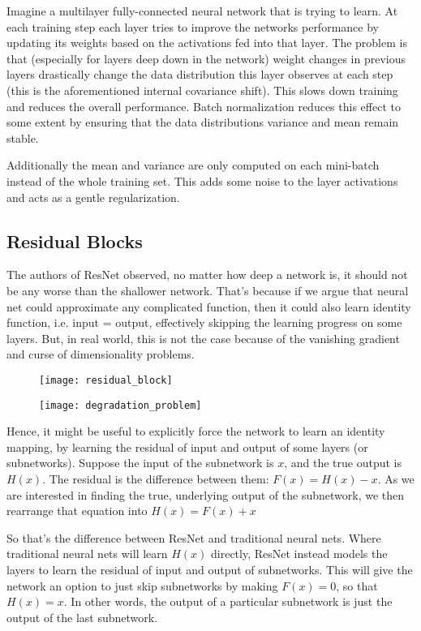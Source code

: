 Imagine a multilayer fully-connected neural network that is trying to learn. At each training step each layer tries to improve the networks performance by updating its weights based on the activations fed into that layer. The problem is that (especially for layers deep down in the network) weight changes in previous layers drastically change the data distribution this layer observes at each step (this is the aforementioned internal covariance shift). This slows down training and reduces the overall performance. Batch normalization reduces this effect to some extent by ensuring that the data distributions variance and mean remain stable.

Additionally the mean and variance are only computed on each mini-batch instead of the whole training set. This adds some noise to the layer activations and acts as a gentle regularization.

\subsection{Residual Blocks \cite{residual-net}}
The authors of ResNet observed, no matter how deep a network is, it should not be any worse than the shallower network. That’s because if we argue that neural net could approximate any complicated function, then it could also learn identity function, i.e. input = output, effectively skipping the learning progress on some layers. But, in real world, this is not the case because of the vanishing gradient and curse of dimensionality problems.

\begin{figure}
	\centering
		\texttt{[image: residual\_block]}
	\label{fig:degradation_problem}
\end{figure}

\begin{figure}
	\centering
		\texttt{[image: degradation\_problem]}
	\label{fig:degradation_problem}
\end{figure}

Hence, it might be useful to explicitly force the network to learn an identity mapping, by learning the residual of input and output of some layers (or subnetworks). Suppose the input of the subnetwork is 
$x$, and the true output is $H(x)$. The residual is the difference between them: $F(x) = H(x) - x$. As we are interested in finding the true, underlying output of the subnetwork, we then rearrange that equation into $H(x) = F(x) + x$

So that’s the difference between ResNet and traditional neural nets. Where traditional neural nets will learn $H(x)$ directly, ResNet instead models the layers to learn the residual of input and output of subnetworks. This will give the network an option to just skip subnetworks by making $F(x) = 0$, so that $H(x) = x$. In other words, the output of a particular subnetwork is just the output of the last subnetwork.

